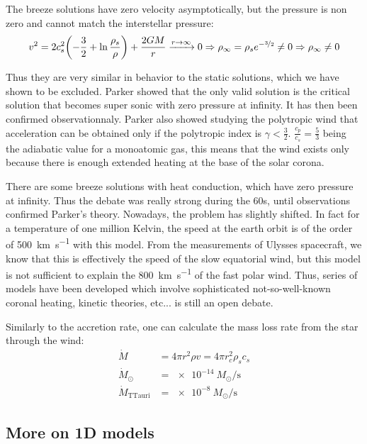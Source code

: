 \documentclass[10pt,a4paper,english]{article}
\let\originalleft\left
\let\originalright\right
\renewcommand{\left}{\mathopen{}\mathclose\bgroup\originalleft}
\renewcommand{\right}{\aftergroup\egroup\originalright}
\begin{document}
The breeze solutions have zero velocity asymptotically, but the pressure is non
zero and cannot match the interstellar pressure:
\begin{equation}
    v^2 = 2 c_s^2 \left( -\frac{3}{2} + \ln \frac{\rho_s}{\rho} \right) + \frac{2GM}{r} \xrightarrow{r\to\infty} 0\Rightarrow \rho_\infty = \rho_s e^{-\nicefrac{3}{2}} \neq 0 \Rightarrow \rho_\infty \neq 0
\end{equation}

Thus they are very similar in behavior to the static solutions, which we have
shown to be excluded. Parker showed that the only valid solution is the
critical solution that becomes super sonic with zero pressure at infinity. It
has then been confirmed observationnaly. Parker also showed studying the
polytropic wind that acceleration can be obtained only if the polytropic index
is $\gamma < \frac{3}{2}$. $\frac{c_p}{c_s} = \frac{5}{3}$ being the adiabatic
value for a monoatomic gas, this means that the wind exists only because there is
enough extended heating at the base of the solar corona.

There are some breeze solutions with heat conduction, which have zero pressure
at infinity. Thus the debate was really strong during the 60s, until
observations confirmed Parker's theory. Nowadays, the problem has slightly
shifted. In fact for a temperature of one million Kelvin, the speed at the
earth orbit is of the order of \SI{500}{\km\per\s} with this model. From the
measurements of Ulysses spacecraft, we know that this is effectively the speed
of the slow equatorial wind, but this model is not sufficient to explain the
\SI{800}{\km\per\s} of the fast polar wind. Thus, series of models have been
developed which involve sophisticated not-so-well-known coronal heating,
kinetic theories, etc... is still an open debate.

Similarly to the accretion rate, one can calculate the mass loss rate from the
star through the wind:
\begin{align}
    \dot{M} & = 4\pi r^2\rho v = 4\pi r^2_c\rho_sc_s \\
    \dot{M}_\odot & = \SI{e-14}{M_\odot\per\s} \\
    \dot{M}_\mathrm{TTauri} &= \SI{e-8}{M_\odot\per\s}
\end{align}

\subsection{More on 1D models}
\end{document}
